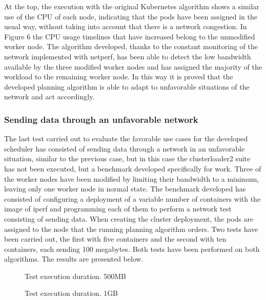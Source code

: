 \documentclass[conference]{IEEEtran}
\begin{document}
At the top, the execution with the original Kubernetes algorithm shows a similar use of the CPU of each node, indicating that the pods have been assigned in the usual way, without taking into account that there is a network congestion. 
In Figure 6 the CPU usage timelines that have increased belong to the unmodified worker node. The algorithm developed, thanks to the constant monitoring of the network implemented with netperf, has 
been able to detect the low bandwidth available by the three modified worker nodes and has assigned the majority of the workload to the remaining worker node. In this way it is proved that the developed 
planning algorithm is able to adapt to unfavorable situations of the network and act accordingly.

\subsubsection{Sending data through an unfavorable network}\label{sec:unfavnet}

The last test carried out to evaluate the favorable use cases for the developed scheduler has consisted of sending data through a network in an unfavorable situation, similar to the previous case, but in 
this case the clusterloader2 suite has not been executed, but a benchmark developed specifically for work. Three of the worker nodes have been modified by limiting their bandwidth to a minimum, leaving 
only one worker node in normal state. The benchmark developed has consisted of configuring a deployment of a variable number of containers with the image of iperf and programming each of them to perform a 
network test consisting of sending data. When creating the cluster deployment, the pods are assigned to the node that the running planning algorithm orders. Two tests have been carried out, the first with 
five containers and the second with ten containers, each sending 100 megabytes. Both tests have been performed on both algorithms. The results are presented below.

\begin{figure}[h]
\begin{center}
\strut{}
\caption{Test execution duration. 500MB}\label{fig:cluster}
\end{center}
\end{figure}

\begin{figure}[h]
\begin{center}
\strut{}
\caption{Test execution duration. 1GB}\label{fig:cluster}
\end{center}
\end{figure}
\end{document}
